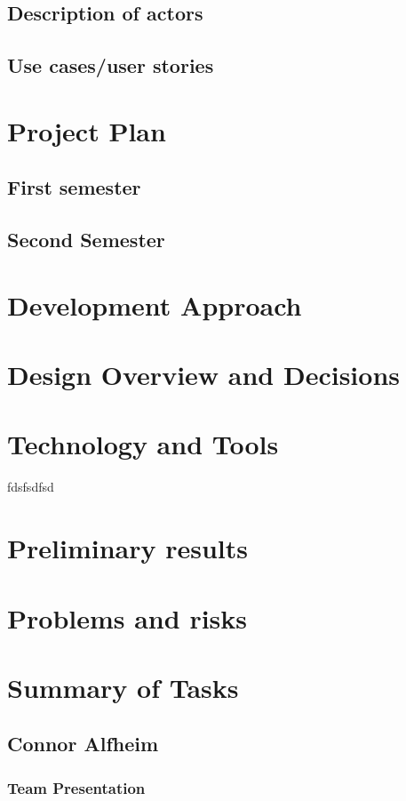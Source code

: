 \documentclass[12pt]{article}
\begin{document}
\begin{spacing}{1.5}
\subsection{Description of actors}
\subsection{Use cases/user stories}

\section{Project Plan}
\subsection{First semester}
\subsection{Second Semester}

\section{Development Approach}

\section{Design Overview and Decisions}

\section{Technology and Tools}
fdsfsdfsd
\section{Preliminary results}

\section{Problems and risks}

\section{Summary of Tasks}
\subsection{Connor Alfheim}
\subsubsection{Team Presentation}

\end{spacing}
\end{document}
